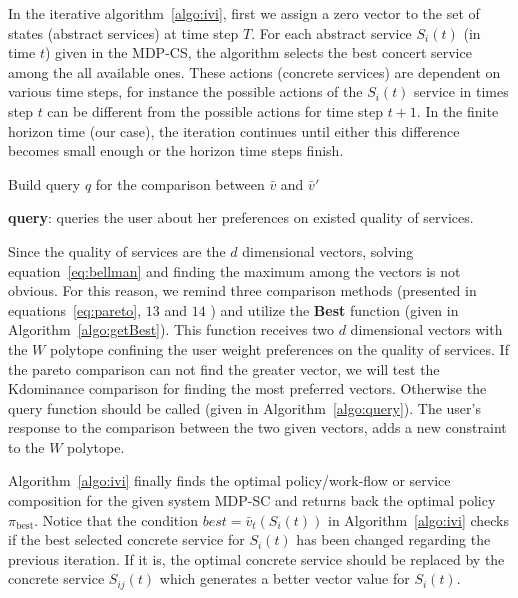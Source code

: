 \documentclass[10pt,journal,compsoc]{IEEEtran}
\begin{document}
In the iterative algorithm~\ref{algo:ivi}, first we assign a zero vector to the set of states (abstract services) at time step $T$. For each abstract service $S_i(t)$ (in time $t$) given in the MDP-CS, the algorithm selects the best concert service among the all available ones. These actions (concrete services) are dependent on various time steps, for instance the possible actions of the $S_i(t)$ service in times step $t$ can be different from the possible actions for time step $t+1$. In the finite horizon time (our case), the iteration continues until either this difference becomes small enough or the horizon time steps finish. 

\begin{algorithm}[]
Build query $q$ for the comparison between $\bar{v}$ and $\bar{v}'$ \\
\caption{\textbf{query}: queries the user about her preferences on existed quality of services.}
\end{algorithm}\label{algo:query}

Since the quality of services are the $d$ dimensional vectors, solving equation~\ref{eq:bellman} and finding the maximum among the vectors is not obvious. For this reason, we remind three comparison methods (presented in equations~\ref{eq:pareto}, $13$ and $14$ %
) and utilize the \textbf{Best} function (given in Algorithm~\ref{algo:getBest}). This function receives two $d$ dimensional vectors with the $W$ polytope confining the user weight preferences on the quality of services. If the pareto comparison can not find the greater vector, we will test the Kdominance comparison for finding the most preferred vectors. Otherwise the query function should be called (given in Algorithm~\ref{algo:query}). The user's response to the comparison between the two given vectors, adds a new constraint to the $W$ polytope. 

Algorithm~\ref{algo:ivi} finally finds the optimal policy/work-flow or service composition for the given system MDP-SC and returns back the optimal policy $\pi_{\text{best}}$. Notice that the condition $best = \bar{v}_t(S_i(t))$ in Algorithm~\ref{algo:ivi} checks if the best selected concrete service for $S_i(t)$ has been changed regarding the previous iteration. If it is, the optimal concrete service should be replaced by the concrete service $S_{ij}(t)$ which generates a better vector value for $S_i(t)$. 
 
\end{document}
